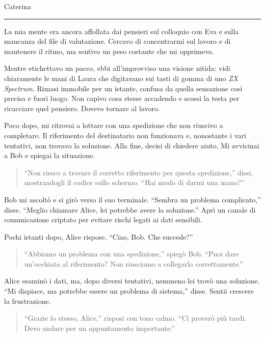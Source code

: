 \vspace{1em}
\begin{center}Caterina\end{center}
\hrule
\vspace{1em}

La mia mente era ancora affollata dai pensieri sul colloquio con Eva e sulla mancanza del file di valutazione. Cercavo di concentrarmi sul lavoro e di mantenere il ritmo, ma sentivo un peso costante che mi opprimeva.

Mentre etichettavo un pacco, ebbi all'improvviso una visione nitida: vidi chiaramente le mani di Laura che digitavano sui tasti di gomma di uno \emph{ZX Spectrum}. Rimasi immobile per un istante, confusa da quella sensazione così precisa e fuori luogo. Non capivo cosa stesse accadendo e scossi la testa per ricacciare quel pensiero. Dovevo tornare al lavoro.

Poco dopo, mi ritrovai a lottare con una spedizione che non riuscivo a completare. Il riferimento del destinatario non funzionava e, nonostante i vari tentativi, non trovavo la soluzione. Alla fine, decisi di chiedere aiuto. Mi avvicinai a Bob e spiegai la situazione.

\begin{quote}
``Non riesco a trovare il corretto riferimento per questa spedizione,'' dissi, mostrandogli il codice sullo schermo. ``Hai modo di darmi una mano?''
\end{quote}

Bob mi ascoltò e si girò verso il suo terminale. ``Sembra un problema complicato,'' disse. ``Meglio chiamare Alice, lei potrebbe avere la soluzione.'' Aprì un canale di comunicazione criptato per evitare rischi legati ai dati sensibili.

Pochi istanti dopo, Alice rispose. ``Ciao, Bob. Che succede?''

\begin{quote}
``Abbiamo un problema con una spedizione,'' spiegò Bob. ``Puoi dare un'occhiata al riferimento? Non riusciamo a collegarlo correttamente.''
\end{quote}

Alice esaminò i dati, ma, dopo diversi tentativi, nemmeno lei trovò una soluzione. ``Mi dispiace, ma potrebbe essere un problema di sistema,'' disse. Sentii crescere la frustrazione.

\begin{quote}
``Grazie lo stesso, Alice,'' risposi con tono calmo. ``Ci proverò più tardi. Devo andare per un appuntamento importante.''
\end{quote}

